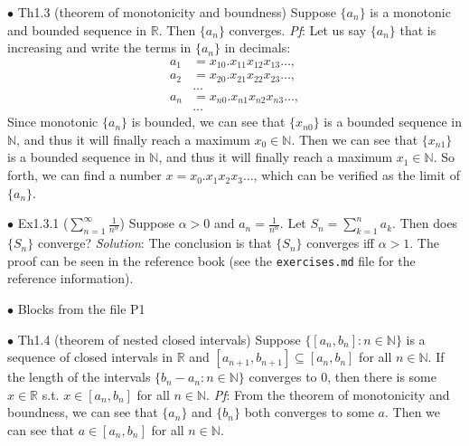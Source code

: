 \documentclass{article}
\begin{document}
\begin{Th}{$\bullet$ Th1.3 (theorem of monotonicity and boundness)}
    Suppose $\{a_n\}$ is a monotonic and bounded sequence in $\mathbb{R}$. Then $\{a_n\}$ converges.
    \tcblower
    \textit{Pf}: Let us say $\{a_n\}$ that is increasing and write the terms in $\{a_n\}$ in decimals:
    $$
    \begin{aligned}
        a_1&=x_{10}.x_{11}x_{12}x_{13}\dots,\\
        a_2&=x_{20}.x_{21}x_{22}x_{23}\dots,\\
        &\dots\\
        a_n&=x_{n0}.x_{n1}x_{n2}x_{n3}\dots,\\
        &\dots
    \end{aligned}
    $$
    Since monotonic $\{a_n\}$ is bounded, we can see that $\{x_{n0}\}$ is a bounded sequence in $\mathbb{N}$, and thus it will finally reach a maximum $x_0\in\mathbb{N}$. Then we can see that $\{x_{n1}\}$ is a bounded sequence in $\mathbb{N}$, and thus it will finally reach a maximum $x_1\in\mathbb{N}$. So forth, we can find a number $x = x_0.x_1x_2x_3\dots$, which can be verified as the limit of $\{a_n\}$.
\end{Th}

\begin{Th}{$\bullet$ Ex1.3.1 ($\sum_{n=1}^{\infty} \frac{1}{n^\alpha}$)}
    Suppose $\alpha>0$ and $a_n = \frac{1}{n^\alpha}$. Let $S_n = \sum_{k=1}^n a_k$. Then does $\{S_n\}$ converge?
    \tcblower
    \textit{Solution}: The conclusion is that $\{S_n\}$ converges iff $\alpha>1$. The proof can be seen in the reference book (see the \verb|exercises.md| file for the reference information).
\end{Th}

\begin{Th}{$\bullet$ Blocks from the file P1}
\end{Th}

\begin{Th}{$\bullet$ Th1.4 (theorem of nested closed intervals)}
    Suppose $\{[a_n, b_n]: n\in\mathbb{N}\}$ is a sequence of closed intervals in $\mathbb{R}$ and $[a_{n+1}, b_{n+1}]\subseteq [a_n, b_n]$ for all $n\in\mathbb{N}$. If the length of the intervals $\{b_n-a_n: n\in\mathbb{N}\}$ converges to $0$, then there is some $x\in\mathbb{R}$ s.t. $x\in[a_n, b_n]$ for all $n\in\mathbb{N}$.
    \tcblower
    \textit{Pf}: From the theorem of monotonicity and boundness, we can see that $\{a_n\}$ and $\{b_n\}$ both converges to some $a$. Then we can see that $a\in[a_n, b_n]$ for all $n\in\mathbb{N}$.
\end{Th}
\end{document}

